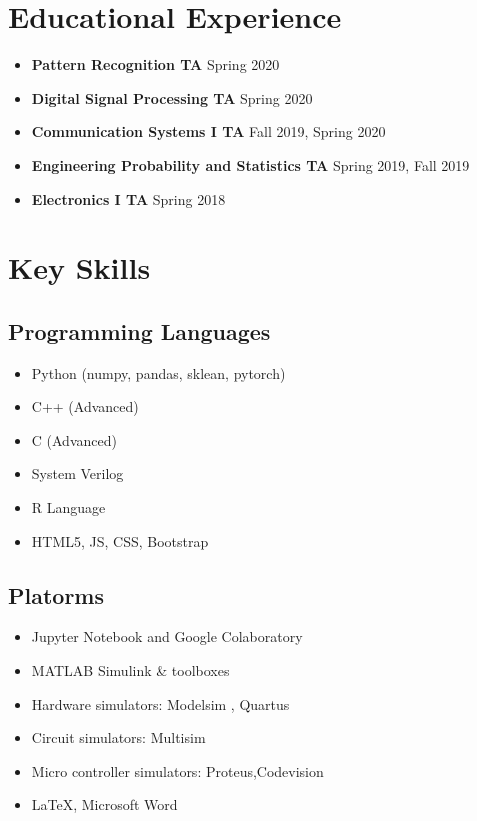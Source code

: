 \documentclass[11pt,a4paper,roman]{moderncv}        %
\begin{document}
\section{Educational Experience}
\begin{itemize}
		\item \textbf{Pattern Recognition TA} \hfill {Spring 2020}
		\item \textbf{Digital Signal Processing TA} \hfill {Spring 2020}
		\item \textbf{Communication Systems I TA} \hfill {Fall 2019, Spring 2020}
		\item \textbf{Engineering Probability and Statistics TA}  \hfill {Spring 2019, Fall 2019}
		\item \textbf{Electronics I TA} \hfill {Spring 2018}
\end{itemize}

\section{Key Skills}
	\begin{minipage}[t]{0.5 \textwidth}
		\subsection{Programming Languages}
		\begin{itemize}
			\item Python (numpy, pandas, sklean, pytorch)
			\item C++ (Advanced)
			\item C (Advanced)
			\item System Verilog
			\item R Language
			\item HTML5, JS, CSS, Bootstrap 
		\end{itemize}
	\end{minipage}
	\begin{minipage}[t]{0.5 \textwidth}
		\subsection{Platorms}
		\begin{itemize}
			\item Jupyter Notebook and Google Colaboratory
			\item MATLAB Simulink \& toolboxes
			\item Hardware simulators: Modelsim , Quartus 
			\item Circuit simulators: Multisim
			\item Micro controller simulators: Proteus,Codevision
			\item \LaTeX, Microsoft Word
		\end{itemize}
	\end{minipage}
\end{document}
